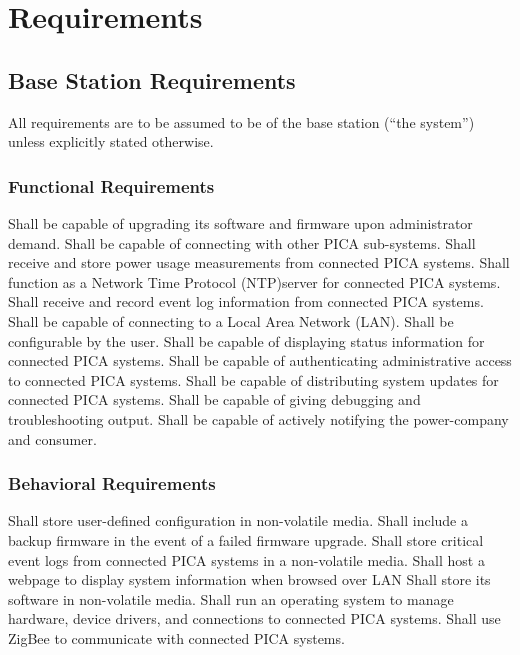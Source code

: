 \section{Requirements}

\subsection{Base Station Requirements}
All requirements are to be assumed to be of the base station (``the system'') unless explicitly stated otherwise.

\subsubsection{Functional Requirements}
\begin{outline}[enumerate]
\1 Shall be capable of upgrading its software and firmware upon administrator demand.
\1 Shall be capable of connecting with other PICA sub-systems.
\1 Shall receive and store power usage measurements from connected PICA systems.
\1 Shall function as a Network Time Protocol (NTP)server for connected PICA systems.
\1 Shall receive and record event log information from connected PICA systems.
\1 Shall be capable of connecting to a Local Area Network (LAN).
\1 Shall be configurable by the user.
\1 Shall be capable of displaying status information for connected PICA systems.
\1 Shall be capable of authenticating administrative access to connected PICA systems.
\1 Shall be capable of distributing system updates for connected PICA systems.
\1 Shall be capable of giving debugging and troubleshooting output.
\1 Shall be capable of actively notifying the power-company and consumer.
\end{outline}
\subsubsection{Behavioral Requirements}
\begin{outline}[enumerate]
\1 Shall store user-defined configuration in non-volatile media.
\1 Shall include a backup firmware in the event of a failed firmware upgrade.
\1 Shall store critical event logs from connected PICA systems in a non-volatile media.
\1 Shall host a webpage to display system information when browsed over LAN
\1 Shall store its software in non-volatile media.
\1 Shall run an operating system to manage hardware, device drivers, and connections to connected PICA systems.
\1 Shall use ZigBee to communicate with connected PICA systems.
\end{outline}

